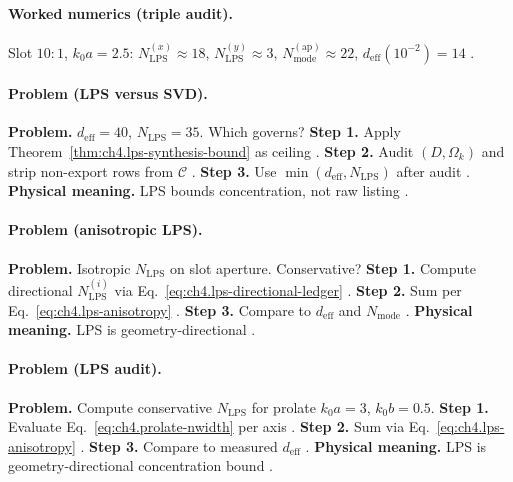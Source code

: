 \paragraph{Worked numerics (triple audit).}
Slot \(10{:}1\), \(k_{0}a=2.5\): \(N_{\mathrm{LPS}}^{(x)}\approx18\), \(N_{\mathrm{LPS}}^{(y)}\approx3\), \(N_{\mathrm{mode}}^{\mathrm{(ap)}}\approx22\),
\(d_{\mathrm{eff}}(10^{-2})=14\) \cite{hansen1988,collin2001,harrington2001,devaney2004}.

\paragraph{Problem (LPS versus SVD).}
\textbf{Problem.} \(d_{\mathrm{eff}}=40\), \(N_{\mathrm{LPS}}=35\). Which governs?
\textbf{Step 1.} Apply Theorem~\ref{thm:ch4.lps-synthesis-bound} as ceiling \cite{hansen1988,stratton1941}.
\textbf{Step 2.} Audit \((D,\Omega_{k})\) and strip non-export rows from \(\mathcal{C}\) \cite{harrington2001,devaney2004}.
\textbf{Step 3.} Use \(\min(d_{\mathrm{eff}},N_{\mathrm{LPS}})\) after audit \cite{jackson1999}.
\textbf{Physical meaning.} LPS bounds concentration, not raw listing \cite{hansen1988}.

\paragraph{Problem (anisotropic LPS).}
\textbf{Problem.} Isotropic \(N_{\mathrm{LPS}}\) on slot aperture. Conservative?
\textbf{Step 1.} Compute directional \(N_{\mathrm{LPS}}^{(i)}\) via Eq.~\eqref{eq:ch4.lps-directional-ledger} \cite{hansen1988}.
\textbf{Step 2.} Sum per Eq.~\eqref{eq:ch4.lps-anisotropy} \cite{jackson1999,stratton1941}.
\textbf{Step 3.} Compare to \(d_{\mathrm{eff}}\) and \(N_{\mathrm{mode}}\) \cite{harrington2001,collin2001}.
\textbf{Physical meaning.} LPS is geometry-directional \cite{hansen1988}.

\paragraph{Problem (LPS audit).}
\textbf{Problem.} Compute conservative \(N_{\mathrm{LPS}}\) for prolate \(k_{0}a=3\), \(k_{0}b=0.5\).
\textbf{Step 1.} Evaluate Eq.~\eqref{eq:ch4.prolate-nwidth} per axis \cite{hansen1988,jackson1999}.
\textbf{Step 2.} Sum via Eq.~\eqref{eq:ch4.lps-anisotropy} \cite{stratton1941,harrington2001}.
\textbf{Step 3.} Compare to measured \(d_{\mathrm{eff}}\) \cite{devaney2004}.
\textbf{Physical meaning.} LPS is geometry-directional concentration bound \cite{hansen1988}.

